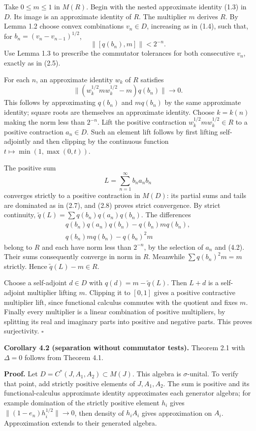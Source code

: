 \documentclass[
  11pt,
]{article}
\begin{document}
Take \(0\leq m\leq1\) in \(M(R)\). Begin with the nested approximate
identity (1.3) in \(D\). Its image is an approximate identity of \(R\).
The multiplier \(m\) derives \(R\). By Lemma 1.2 choose convex
combinations \(v_n\in D\), increasing as in (1.4), such that, for
\(b_n=(v_n-v_{n-1})^{1/2}\), \[
\|[q(b_n),m]\|<2^{-n}.
\tag{4.2}
\] Use Lemma 1.3 to prescribe the commutator tolerances for both
consecutive \(v_n\), exactly as in (2.5).

For each \(n\), an approximate identity \(w_k\) of \(R\) satisfies \[
\|(w_k^{1/2}mw_k^{1/2}-m)q(b_n)\|\longrightarrow0.
\] This follows by approximating \(q(b_n)\) and \(mq(b_n)\) by the same
approximate identity; square roots are themselves an approximate
identity. Choose \(k=k(n)\) making the norm less than \(2^{-n}\). Lift
the positive contraction \(w_k^{1/2}mw_k^{1/2}\in R\) to a positive
contraction \(a_n\in D\). Such an element lift follows by first lifting
self-adjointly and then clipping by the continuous function
\(t\mapsto\min(1,\max(0,t))\).

The positive sum \[
L=\sum_{n=1}^\infty b_na_nb_n
\tag{4.3}
\] converges strictly to a positive contraction in \(M(D)\): its partial
sums and tails are dominated as in (2.7), and (2.8) proves strict
convergence. By strict continuity,
\(\widetilde q(L)=\sum q(b_n)q(a_n)q(b_n)\). The differences \[
\begin{aligned}
q(b_n)q(a_n)q(b_n)-q(b_n)mq(b_n),\\
q(b_n)mq(b_n)-q(b_n)^2m
\end{aligned}
\tag{4.4}
\] belong to \(R\) and each have norm less than \(2^{-n}\), by the
selection of \(a_n\) and (4.2). Their sums consequently converge in norm
in \(R\). Meanwhile \(\sum q(b_n)^2m=m\) strictly. Hence
\(\widetilde q(L)-m\in R\).

Choose a self-adjoint \(d\in D\) with \(q(d)=m-\widetilde q(L)\). Then
\(L+d\) is a self-adjoint multiplier lifting \(m\). Clipping it to
\([0,1]\) gives a positive contractive multiplier lift, since functional
calculus commutes with the quotient and fixes \(m\). Finally every
multiplier is a linear combination of positive multipliers, by splitting
its real and imaginary parts into positive and negative parts. This
proves surjectivity. \(\square\)

\textbf{Corollary 4.2 (separation without commutator tests).} Theorem
2.1 with \(\Delta=0\) follows from Theorem 4.1.

\textbf{Proof.} Let \(D=C^*(J,A_1,A_2)\subset M(J)\). This algebra is
\(\sigma\)-unital. To verify that point, add strictly positive elements
of \(J,A_1,A_2\). The sum is positive and its functional-calculus
approximate identity approximates each generator algebra; for example
domination of the strictly positive element \(h_i\) gives
\(\|(1-e_n)h_i^{1/2}\|\to0\), then density of \(h_iA_i\) gives
approximation on \(A_i\). Approximation extends to their generated
algebra.
\end{document}
